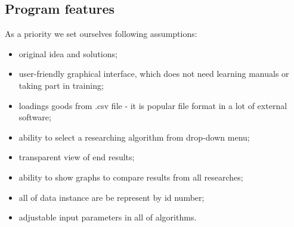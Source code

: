 \documentclass[conference,compsoc]{IEEEtran}
\begin{document}
\subsection{Program features}
As a priority we set ourselves following assumptions:
\begin{itemize}
\item original idea and solutions;
\item user-friendly graphical interface, which does not need learning manuals or taking part in training;
\item loadings goods from .csv file - it is popular file format in a lot of external software; 
\item ability to select a researching algorithm from drop-down menu;
\item transparent view of end results;
\item ability to show graphs to compare results from all researches;
\item all of data instance are be represent by id number;
\item adjustable input parameters in all of algorithms.
\end{itemize}
\end{document}
